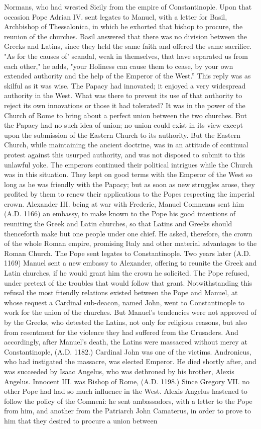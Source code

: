 Normans, who had wrested Sicily from the empire of Constantinople. Upon that occasion Pope Adrian IV. sent legates to Manuel, with a letter for Basil, Archbishop of Thessalonica, in which he exhorted that bishop to procure, the reunion of the churches. Basil answered that there was no division between the Greeks and Latins, since they held the same faith and offered the same sacrifice. "As for the causes of' scandal, weak in themselves, that have separated us from each other," he adds, "your Holiness can cause them to cease, by your own extended authority and the help of the Emperor of the West.” This reply was as skilful as it was wise. The Papacy had innovated; it enjoyed a very widespread authority in the West. What was there to prevent its use of that authority to reject its own innovations or those it had tolerated? It was in the power of the Church of Rome to bring about a perfect union between the two churches. But the Papacy had no such idea of union; no union could exist in its view except upon the submission of the Eastern Church to its authority. But the Eastern Church, while maintaining the ancient doctrine, was in an attitude of continual protest against this usurped authority, and was not disposed to submit to this unlawful yoke. The emperors continued their political intrigues while the Church was in this situation. They kept on good terms with the Emperor of the West so long as he was friendly with the Papacy; but as soon as new struggles arose, they profited by them to renew their applications to the Popes respecting the imperial crown. Alexander III. being at war with Frederic, Manuel Comnenus sent him (A.D. 1166) an embassy, to make known to the Pope his good intentions of reuniting the Greek and Latin churches, so that Latins and Greeks should thenceforth make but one people under one chief. He asked, therefore, the crown of the whole Roman empire, promising Italy and other material advantages to the Roman Church. The Pope sent legates to Constantinople. Two years later (A.D. 1169) Manuel sent a new embassy to Alexander, offering to reunite the Greek and Latin churches, if he would grant him the crown he solicited. The Pope refused, under pretext of the troubles that would follow that grant. Notwithstanding this refusal the most friendly relations existed between the Pope and Manuel, at whose request a Cardinal sub-deacon, named John, went to Constantinople to work for the union of the churches. But Manuel’s tendencies were not approved of by the Greeks, who detested the Latins, not only for religious reasons, but also from resentment for the violence they had suffered from the Crusaders. And accordingly, after Manuel's death, the Latins were massacred without mercy at Constantinople, (A.D. 1182.) Cardinal John was one of the victims. Andronicus, who had instigated the massacre, was elected Emperor. He died shortly after, and was succeeded by Isaac Angelus, who was dethroned by his brother, Alexis Angelus. Innocent III. was Bishop of Rome, (A.D. 1198.) Since Gregory VII. no other Pope had had so much influence in the West. Alexis Angelus hastened to follow the policy of the Comneni: he sent ambassadors, with a letter to the Pope from him, and another from the Patriarch John Camaterus, in order to prove to him that they desired to procure a union between 